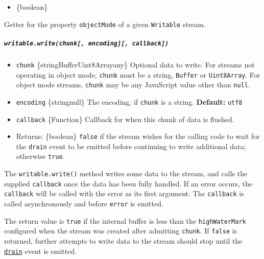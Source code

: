 \begin{itemize}
\tightlist
\item
  \{boolean\}
\end{itemize}

Getter for the property \texttt{objectMode} of a given \texttt{Writable}
stream.

\subparagraph{\texorpdfstring{\texttt{writable.write(chunk{[},\ encoding{]}{[},\ callback{]})}}{writable.write(chunk{[}, encoding{]}{[}, callback{]})}}\label{writable.writechunk-encoding-callback}

\begin{itemize}
\tightlist
\item
  \texttt{chunk}
  \{string\textbar Buffer\textbar Uint8Array\textbar any\} Optional data
  to write. For streams not operating in object mode, \texttt{chunk}
  must be a string, \texttt{Buffer} or \texttt{Uint8Array}. For object
  mode streams, \texttt{chunk} may be any JavaScript value other than
  \texttt{null}.
\item
  \texttt{encoding} \{string\textbar null\} The encoding, if
  \texttt{chunk} is a string. \textbf{Default:}
  \texttt{\textquotesingle{}utf8\textquotesingle{}}
\item
  \texttt{callback} \{Function\} Callback for when this chunk of data is
  flushed.
\item
  Returns: \{boolean\} \texttt{false} if the stream wishes for the
  calling code to wait for the
  \texttt{\textquotesingle{}drain\textquotesingle{}} event to be emitted
  before continuing to write additional data; otherwise \texttt{true}.
\end{itemize}

The \texttt{writable.write()} method writes some data to the stream, and
calls the supplied \texttt{callback} once the data has been fully
handled. If an error occurs, the \texttt{callback} will be called with
the error as its first argument. The \texttt{callback} is called
asynchronously and before
\texttt{\textquotesingle{}error\textquotesingle{}} is emitted.

The return value is \texttt{true} if the internal buffer is less than
the \texttt{highWaterMark} configured when the stream was created after
admitting \texttt{chunk}. If \texttt{false} is returned, further
attempts to write data to the stream should stop until the
\hyperref[event-drain]{\texttt{\textquotesingle{}drain\textquotesingle{}}}
event is emitted.

